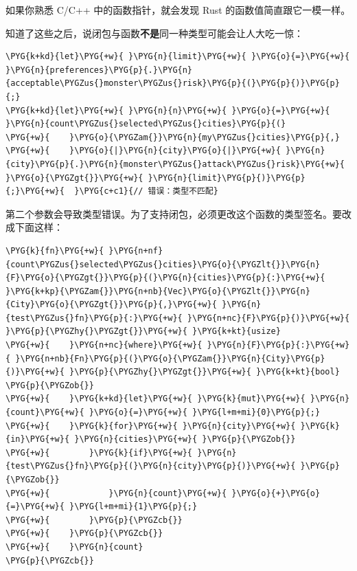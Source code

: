 如果你熟悉 C/C++ 中的函数指针，就会发现 Rust 的函数值简直跟它一模一样。

知道了这些之后，说闭包与函数\textbf{不是}同一种类型可能会让人大吃一惊：

\begin{Verbatim}[commandchars=\\\{\},breaklines=true,breakanywhere=true,fontsize=\codefont,xleftmargin=17bp]
\PYG{k+kd}{let}\PYG{+w}{ }\PYG{n}{limit}\PYG{+w}{ }\PYG{o}{=}\PYG{+w}{ }\PYG{n}{preferences}\PYG{p}{.}\PYG{n}{acceptable\PYGZus{}monster\PYGZus{}risk}\PYG{p}{(}\PYG{p}{)}\PYG{p}{;}
\PYG{k+kd}{let}\PYG{+w}{ }\PYG{n}{n}\PYG{+w}{ }\PYG{o}{=}\PYG{+w}{ }\PYG{n}{count\PYGZus{}selected\PYGZus{}cities}\PYG{p}{(}
\PYG{+w}{    }\PYG{o}{\PYGZam{}}\PYG{n}{my\PYGZus{}cities}\PYG{p}{,}
\PYG{+w}{    }\PYG{o}{|}\PYG{n}{city}\PYG{o}{|}\PYG{+w}{ }\PYG{n}{city}\PYG{p}{.}\PYG{n}{monster\PYGZus{}attack\PYGZus{}risk}\PYG{+w}{ }\PYG{o}{\PYGZgt{}}\PYG{+w}{ }\PYG{n}{limit}\PYG{p}{)}\PYG{p}{;}\PYG{+w}{  }\PYG{c+c1}{// 错误：类型不匹配}
\end{Verbatim}

第二个参数会导致类型错误。为了支持闭包，必须更改这个函数的类型签名。要改成下面这样：

\begin{Verbatim}[commandchars=\\\{\},breaklines=true,breakanywhere=true,fontsize=\codefont,xleftmargin=17bp]
\PYG{k}{fn}\PYG{+w}{ }\PYG{n+nf}{count\PYGZus{}selected\PYGZus{}cities}\PYG{o}{\PYGZlt{}}\PYG{n}{F}\PYG{o}{\PYGZgt{}}\PYG{p}{(}\PYG{n}{cities}\PYG{p}{:}\PYG{+w}{ }\PYG{k+kp}{\PYGZam{}}\PYG{n+nb}{Vec}\PYG{o}{\PYGZlt{}}\PYG{n}{City}\PYG{o}{\PYGZgt{}}\PYG{p}{,}\PYG{+w}{ }\PYG{n}{test\PYGZus{}fn}\PYG{p}{:}\PYG{+w}{ }\PYG{n+nc}{F}\PYG{p}{)}\PYG{+w}{ }\PYG{p}{\PYGZhy{}\PYGZgt{}}\PYG{+w}{ }\PYG{k+kt}{usize}
\PYG{+w}{    }\PYG{n+nc}{where}\PYG{+w}{ }\PYG{n}{F}\PYG{p}{:}\PYG{+w}{ }\PYG{n+nb}{Fn}\PYG{p}{(}\PYG{o}{\PYGZam{}}\PYG{n}{City}\PYG{p}{)}\PYG{+w}{ }\PYG{p}{\PYGZhy{}\PYGZgt{}}\PYG{+w}{ }\PYG{k+kt}{bool}
\PYG{p}{\PYGZob{}}
\PYG{+w}{    }\PYG{k+kd}{let}\PYG{+w}{ }\PYG{k}{mut}\PYG{+w}{ }\PYG{n}{count}\PYG{+w}{ }\PYG{o}{=}\PYG{+w}{ }\PYG{l+m+mi}{0}\PYG{p}{;}
\PYG{+w}{    }\PYG{k}{for}\PYG{+w}{ }\PYG{n}{city}\PYG{+w}{ }\PYG{k}{in}\PYG{+w}{ }\PYG{n}{cities}\PYG{+w}{ }\PYG{p}{\PYGZob{}}
\PYG{+w}{        }\PYG{k}{if}\PYG{+w}{ }\PYG{n}{test\PYGZus{}fn}\PYG{p}{(}\PYG{n}{city}\PYG{p}{)}\PYG{+w}{ }\PYG{p}{\PYGZob{}}
\PYG{+w}{            }\PYG{n}{count}\PYG{+w}{ }\PYG{o}{+}\PYG{o}{=}\PYG{+w}{ }\PYG{l+m+mi}{1}\PYG{p}{;}
\PYG{+w}{        }\PYG{p}{\PYGZcb{}}
\PYG{+w}{    }\PYG{p}{\PYGZcb{}}
\PYG{+w}{    }\PYG{n}{count}
\PYG{p}{\PYGZcb{}}
\end{Verbatim}

